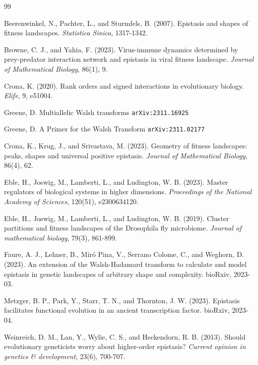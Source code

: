 \documentclass[12pt]{amsart}
\theoremstyle{plain}
\theoremstyle{definition}
\begin{document}
\begin{thebibliography}{99}


Beerenwinkel, N., Pachter, L., and Sturmfels, B. (2007). 
Epistasis and shapes of fitness landscapes.  {\emph{Statistica Sinica}}, 1317-1342.


Browne, C. J., and Yahia, F. (2023). 
Virus-immune dynamics determined by prey-predator interaction network and epistasis in viral fitness landscape. 
{\emph{Journal of Mathematical Biology}}, 86(1), 9.



Crona, K. (2020). 
Rank orders and signed interactions in evolutionary biology. {\emph{Elife}}, 9, e51004.




Greene, D.
Multiallelic Walsh transforms
{\tt arXiv:2311.16925}


Greene, D.
A Primer for the Walsh Transform
{\tt arXiv:2311.02177}




Crona, K., Krug, J., and Srivastava, M. (2023). 
Geometry of fitness landscapes: peaks, shapes and universal positive epistasis. 
{\emph{Journal of Mathematical Biology}}, 86(4), 62.




Eble, H., Joswig, M., Lamberti, L., and Ludington, W. B. (2023). 
Master regulators of biological systems in higher dimensions.
{\emph{Proceedings of the National Academy of Sciences}}, 120(51), e2300634120.

Eble, H., Joswig, M., Lamberti, L., and Ludington, W. B. (2019). 
Cluster partitions and fitness landscapes of the Drosophila fly microbiome. 
{\emph{Journal of mathematical biology}}, 79(3), 861-899.


Faure, A. J., Lehner, B., Miró Pina, V., Serrano Colome, C., and Weghorn, D. (2023). 
An extension of the Walsh-Hadamard transform to calculate and model epistasis
in genetic landscapes of arbitrary shape and complexity. bioRxiv, 2023-03.


Metzger, B. P., Park, Y., Starr, T. N., and Thornton, J. W. (2023).
 Epistasis facilitates functional evolution in an ancient transcription factor. bioRxiv, 2023-04.


Weinreich, D. M., Lan, Y.,  Wylie, C. S., and Heckendorn, R. B. (2013). 
Should evolutionary geneticists worry about higher-order epistasis?
{\emph{Current opinion in genetics \& development}}, 23(6), 700-707.

\end{thebibliography}


 
\end{document}
